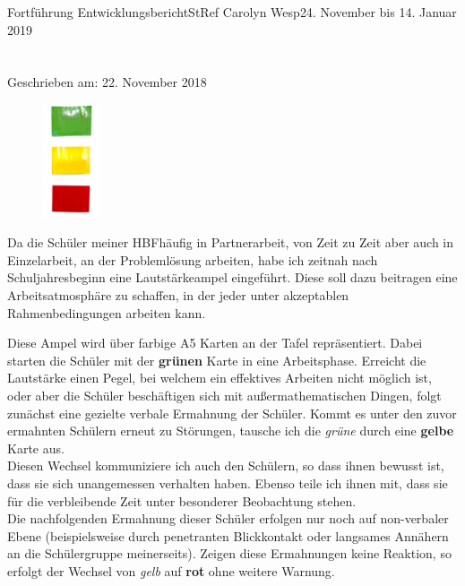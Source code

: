 \documentclass[oneside,openany,headings=optiontotoc,11pt,numbers=noenddot]{article}
\begin{document}
\begin{worksheet}{Fortführung Entwicklungsbericht}{StRef\grq{} Carolyn Wesp}{24. November bis 14. Januar 2019}
		\section*{}
		\tiny{Geschrieben am: 22. November 2018}\small\\
		\par\noindent
		\begin{figure}
			\centering
			\includegraphics[width=0.15\textwidth]{LSA.jpg}
		\end{figure} Da die Schüler meiner HBF\footnotemark[1] häufig in Partnerarbeit, von Zeit zu Zeit aber auch in Einzelarbeit, an der Problemlösung arbeiten, habe ich zeitnah nach Schuljahresbeginn eine Lautstärkeampel eingeführt. Diese soll dazu beitragen eine Arbeitsatmosphäre zu schaffen, in der jeder unter akzeptablen Rahmenbedingungen arbeiten kann.\\
		\par\noindent
		Diese Ampel wird über farbige A5 Karten an der Tafel repräsentiert. Dabei starten die Schüler mit der \textbf{grünen} Karte in eine Arbeitsphase. Erreicht die Lautstärke einen Pegel, bei welchem ein effektives Arbeiten nicht möglich ist, oder aber die Schüler beschäftigen sich mit außermathematischen Dingen, folgt zunächst eine gezielte verbale Ermahnung der Schüler. Kommt es unter den zuvor ermahnten Schülern erneut zu Störungen, tausche ich die \textit{grüne} durch eine \textbf{gelbe} Karte aus.\\
		Diesen Wechsel kommuniziere ich auch den Schülern, so dass ihnen bewusst ist, dass sie sich unangemessen verhalten haben. Ebenso teile ich ihnen mit, dass sie für die verbleibende Zeit unter besonderer Beobachtung stehen.\\
		Die nachfolgenden Ermahnung dieser Schüler erfolgen nur noch auf non-verbaler Ebene (beispielsweise durch \grq{}penetranten\grq{} Blickkontakt oder langsames Annähern an die Schülergruppe meinerseits). Zeigen diese Ermahnungen keine Reaktion, so erfolgt der Wechsel von \textit{gelb} auf \textbf{rot} ohne weitere Warnung.
		\par

\end{worksheet}
\end{document}
